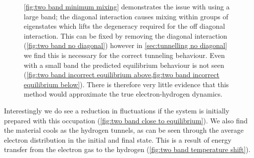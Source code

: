 \begin{figure}[htbp]
{        \cref{fig:two band minimum mixing}
        demonstrates the issue with
        using a large band; the diagonal
        interaction causes mixing within
        groups of eigenstates which
        lifts the degeneracy required for
        the off diagonal interaction.
        This can be fixed by removing
        the diagonal interaction
        (\cref{fig:two band no diagonal})
        however in
        \cref{sec:tunnelling no diagonal}
        we find this is
        necessary for the correct
        tunneling behaviour.
        Even with a small band
        the
        predicted equilibrium
        behaviour is not seen
        (\cref{fig:two band incorrect equilibrium above,fig:two band incorrect equilibrium below}).
        There is therefore very
        little evidence that
        this method would
        approximate the true
        electron-hydrogen dynamics.
    }\label{fig:issue with two band approach}
\end{figure}
Interestingly we do see a reduction in
fluctuations if the system is initially
prepared with this occupation
(\cref{fig:two band close to equilibrium}).
We also find the material cools
as the hydrogen tunnels, as can be seen
through the average electron distribution in
the initial and final state. This is a
result of energy transfer from the
electron gas to the hydrogen
(\cref{fig:two band temperature shift}).

